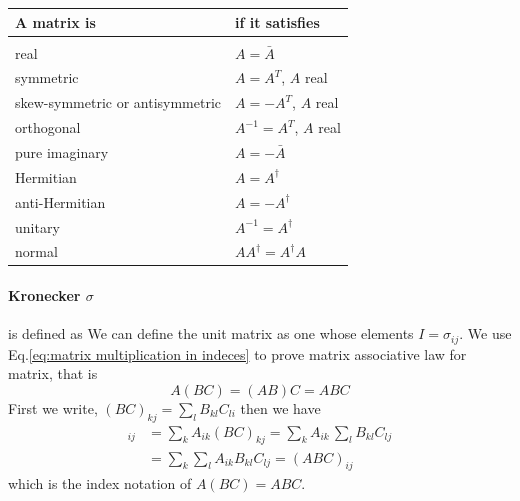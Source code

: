             \begin{center}
                \begin{tabular}{l l}
                    \hline
                    A matrix is & if it satisfies\\
                    \hline \\
                    real           & $A = \bar{A}$ \\
                    symmetric      & $A = A^T$, $A$ real \\
                    skew-symmetric or antisymmetric & $A = -A^T$, $A$ real \\
                    orthogonal     & $A^{-1} = A^T$, $A$ real \\
                    pure imaginary & $A = - \bar{A}$ \\ 
                    Hermitian      & $A = A^\dagger$ \\
                    anti-Hermitian & $A = - A^\dagger$ \\
                    unitary        & $A^{-1} = A^\dagger$ \\
                    normal         & $A A^\dagger = A^\dagger A$\\
                    \hline
                \end{tabular}
                \label{tab:matrix special properties}
            \end{center}

            \paragraph{Kronecker $\sigma$} is defined  as 
            We can define the unit matrix as one whose elements $I = \sigma_{ij}$. We use Eq.\eqref{eq:matrix multiplication in indeces} to prove
            matrix associative law for matrix, that is 
            $$ A(BC) = (AB)C = ABC $$
            First we write, $(BC)_{kj} = \sum_l B_{kl} C_{li}$ then we have
            \begin{align*}
                [A(BC)]_{ij} &= \sum_k A_{ik} (BC)_{kj} = \sum_k A_{ik}\, \sum_l B_{kl} C_{lj} \\
                             &= \sum_k \sum_l A_{ik} B_{kl} C_{lj} = (ABC)_{ij}
            \end{align*}
            which is the index notation of $A(BC)= ABC$.

